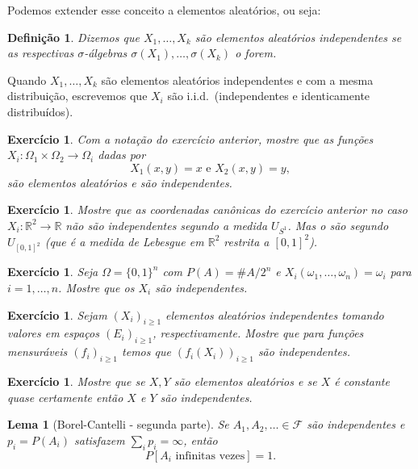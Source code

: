 \documentclass[reqno, draft]{book}
\newcommand*\1{\mathds{1}}
\newtheorem{lemma}[theorem]{Lema}
\newtheorem{definition}[theorem]{Definição}
\newtheorem{exercise}[example]{Exercício}
\def \iid{i.i.d.~}
\begin{document}
Podemos extender esse conceito a elementos aleatórios, ou seja:
\begin{definition}
  Dizemos que $X_1, \dots, X_k$ são elementos aleatórios independentes  se as respectivas $\sigma$-álgebras $\sigma(X_1), \dots, \sigma(X_k)$ o forem.
\end{definition}

Quando $X_1, \dots, X_k$ são elementos aleatórios independentes e com a mesma distribuição, escrevemos que $X_i$ são \iid (independentes e identicamente distribuídos).

\begin{exercise}
  Com a notação do exercício anterior, mostre que as funções $X_i:\Omega_1 \times \Omega_2 \to \Omega_i$ dadas por
  \begin{equation}
    X_1(x,y) = x \text{ e } X_2 (x,y) = y,
  \end{equation}
  são elementos aleatórios e são independentes.
\end{exercise}

\begin{exercise}
  Mostre que as coordenadas canônicas do exercício anterior no caso $X_i: \mathbb{R}^2 \to \mathbb{R}$ não são independentes segundo a medida $U_{S^1}$.
  Mas o são segundo $U_{[0,1]^2}$ (que é a medida de Lebesgue em $\mathbb{R}^2$ restrita a $[0,1]^2$).
\end{exercise}

\begin{exercise}
  Seja $\Omega = \{0,1\}^n$ com $P(A) = \#A/2^n$ e $X_i(\omega_1, \dots, \omega_n) = \omega_i$ para $i = 1, \dots, n$.
  Mostre que os $X_i$ são independentes.
\end{exercise}

\begin{exercise}
  Sejam $(X_i)_{i \geq 1}$ elementos aleatórios independentes tomando valores em espaços $(E_i)_{i \geq 1}$, respectivamente.
  Mostre que para funções mensuráveis $(f_i)_{i \geq 1}$ temos que $(f_i(X_i))_{i \geq 1}$ são independentes.
\end{exercise}

\begin{exercise}
  Mostre que se $X, Y$ são elementos aleatórios e se $X$ é constante quase certamente então $X$ e $Y$ são independentes.
\end{exercise}

\begin{lemma}[Borel-Cantelli - segunda parte]
  Se $A_1, A_2, \dots \in \mathcal{F}$ são independentes e $p_i = P(A_i)$ satisfazem $\sum_i p_i = \infty$, então
  \begin{equation}
    P[A_i \text{ infinitas vezes}] = 1.
  \end{equation}
\end{lemma}
\end{document}
